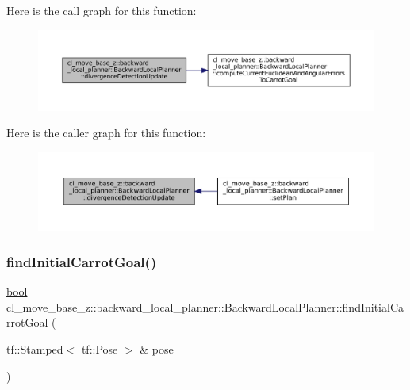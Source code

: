 Here is the call graph for this function\+:
\nopagebreak
\begin{figure}[H]
\begin{center}
\leavevmode
\includegraphics[width=350pt]{classcl__move__base__z_1_1backward__local__planner_1_1BackwardLocalPlanner_ab1b01ecdb27641dde60661362d75465b_cgraph}
\end{center}
\end{figure}
Here is the caller graph for this function\+:
\nopagebreak
\begin{figure}[H]
\begin{center}
\leavevmode
\includegraphics[width=350pt]{classcl__move__base__z_1_1backward__local__planner_1_1BackwardLocalPlanner_ab1b01ecdb27641dde60661362d75465b_icgraph}
\end{center}
\end{figure}
\mbox{\label{classcl__move__base__z_1_1backward__local__planner_1_1BackwardLocalPlanner_a0025cd3ffaa04a6a02492a33673a78a1}} 
\subsubsection{\texorpdfstring{find\+Initial\+Carrot\+Goal()}{findInitialCarrotGoal()}}
{\footnotesize\ttfamily \hyperlink{classbool}{bool} cl\+\_\+move\+\_\+base\+\_\+z\+::backward\+\_\+local\+\_\+planner\+::\+Backward\+Local\+Planner\+::find\+Initial\+Carrot\+Goal (\begin{DoxyParamCaption}\item[{tf\+::\+Stamped$<$ tf\+::\+Pose $>$ \&}]{pose }\end{DoxyParamCaption})\hspace{0.3cm}{\ttfamily [private]}}



